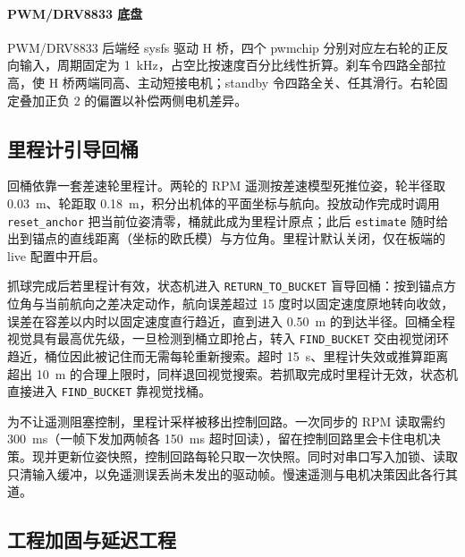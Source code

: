\paragraph{PWM/DRV8833 底盘}
PWM/DRV8833 后端经 sysfs 驱动 H 桥，四个 pwmchip 分别对应左右轮的正反向输入，周期固定为 1~kHz，占空比按速度百分比线性折算。刹车令四路全部拉高，使 H 桥两端同高、主动短接电机；standby 令四路全关、任其滑行。右轮固定叠加正负 2 的偏置以补偿两侧电机差异。

\subsection{里程计引导回桶}


回桶依靠一套差速轮里程计。两轮的 RPM 遥测按差速模型死推位姿，轮半径取 0.03~m、轮距取 0.18~m，积分出机体的平面坐标与航向。投放动作完成时调用 \texttt{reset\_anchor} 把当前位姿清零，桶就此成为里程计原点；此后 \texttt{estimate} 随时给出到锚点的直线距离（坐标的欧氏模）与方位角。里程计默认关闭，仅在板端的 live 配置中开启。

抓球完成后若里程计有效，状态机进入 \texttt{RETURN\_TO\_BUCKET} 盲导回桶：按到锚点方位角与当前航向之差决定动作，航向误差超过 15 度时以固定速度原地转向收敛，误差在容差以内时以固定速度直行趋近，直到进入 0.50~m 的到达半径。回桶全程视觉具有最高优先级，一旦检测到桶立即抢占，转入 \texttt{FIND\_BUCKET} 交由视觉闭环趋近，桶位因此被记住而无需每轮重新搜索。超时 15~s、里程计失效或推算距离超出 10~m 的合理上限时，同样退回视觉搜索。若抓取完成时里程计无效，状态机直接进入 \texttt{FIND\_BUCKET} 靠视觉找桶。

为不让遥测阻塞控制，里程计采样被移出控制回路。一次同步的 RPM 读取需约 300~ms（一帧下发加两帧各 150~ms 超时回读），留在控制回路里会卡住电机决策。现并更新位姿快照，控制回路每轮只取一次快照。同时对串口写入加锁、读取只清输入缓冲，以免遥测误丢尚未发出的驱动帧。慢速遥测与电机决策因此各行其道。

\subsection{工程加固与延迟工程}



